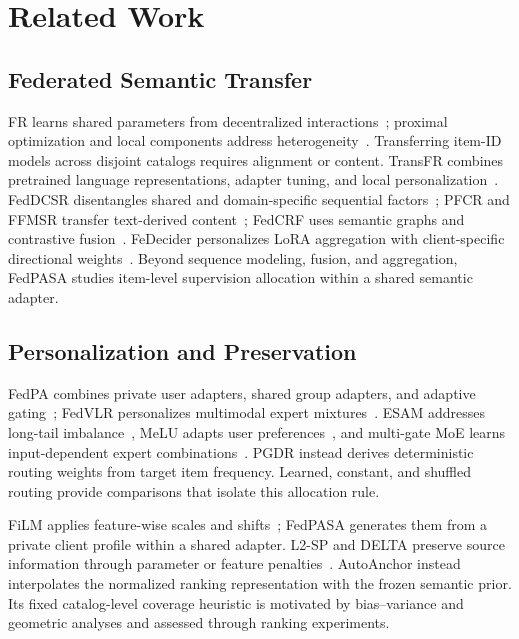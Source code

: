 \section{Related Work}
\label{sec:related}
\subsection{Federated Semantic Transfer}
FR learns shared parameters from decentralized interactions~\citep{ammad2019federated,mcmahan2017communication}; proximal optimization and local components address heterogeneity~\citep{li2020federated,arivazhagan2019federated,dinh2020personalized,li2021ditto}. Transferring item-ID models across disjoint catalogs requires alignment or content. TransFR combines pretrained language representations, adapter tuning, and local personalization~\citep{zhang2026transfr}. FedDCSR disentangles shared and domain-specific sequential factors~\citep{zhang2024feddcsr}; PFCR and FFMSR transfer text-derived content~\citep{guo2024pfcr,lu2025ffmsr}; FedCRF uses semantic graphs and contrastive fusion~\citep{guo2026fedcrf}. FeDecider personalizes LoRA aggregation with client-specific directional weights~\citep{he2026fedecider}. Beyond sequence modeling, fusion, and aggregation, FedPASA studies item-level supervision allocation within a shared semantic adapter.

\subsection{Personalization and Preservation}
FedPA combines private user adapters, shared group adapters, and adaptive gating~\citep{li2026fedpa}; FedVLR personalizes multimodal expert mixtures~\citep{li2026fedvlr}. ESAM addresses long-tail imbalance~\citep{chen2021esam}, MeLU adapts user preferences~\citep{lee2019melu}, and multi-gate MoE learns input-dependent expert combinations~\citep{ma2018mmoe}. PGDR instead derives deterministic routing weights from target item frequency. Learned, constant, and shuffled routing provide comparisons that isolate this allocation rule.

FiLM applies feature-wise scales and shifts~\citep{perez2018film}; FedPASA generates them from a private client profile within a shared adapter. L2-SP and DELTA preserve source information through parameter or feature penalties~\citep{li2018explicit,li2019delta}. AutoAnchor instead interpolates the normalized ranking representation with the frozen semantic prior. Its fixed catalog-level coverage heuristic is motivated by bias--variance and geometric analyses and assessed through ranking experiments.

